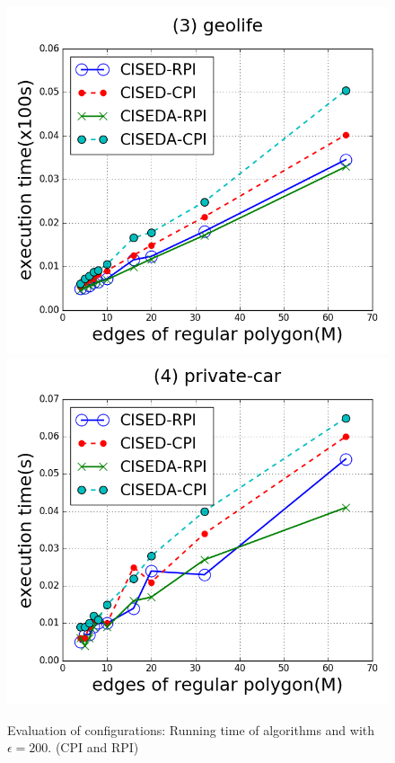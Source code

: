 \begin{figure}[tb!]
\includegraphics[scale = 0.250]{figures/Exp-M-e-200-time-geolife.png}
\includegraphics[scale = 0.250]{figures/Exp-M-e-200-time-private.png}
\vspace{-2ex}
\caption{\small Evaluation of configurations: Running time of algorithms \cist and \cista with $\epsilon = 200$. (CPI and RPI)}
\label{fig:m-time-e200}
\vspace{-1ex}
\end{figure}



